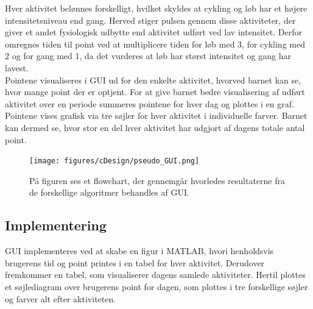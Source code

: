 Hver aktivitet belønnes forskelligt, hvilket skyldes at cykling og løb har et højere intensitetsniveau end gang. Herved stiger pulsen gennem disse aktiviteter, der giver et andet fysiologisk udbytte end aktivitet udført ved lav intensitet. Derfor omregnes tiden til point ved at multiplicere tiden for løb med 3, for cykling med 2 og for gang med 1, da det vurderes at løb har størst intensitet og gang har lavest.\\ 
Pointene visualiseres i GUI ud for den enkelte aktivitet, hvorved barnet kan se, hvor mange point der er optjent. For at give barnet bedre visualisering af udført aktivitet over en periode summeres pointene for hver dag og plottes i en graf. Pointene vises grafisk via tre søjler for hver aktivitet i individuelle farver. Barnet kan dermed se, hvor stor en del hver aktivitet har udgjort af dagens totale antal point.  
\begin{figure}[H]
	\centering
	\texttt{[image: figures/cDesign/pseudo\_GUI.png]}
	\caption{På figuren ses et flowchart, der gennemgår hvorledes resultaterne fra de forskellige algoritmer behandles af GUI.}
	\label{fig:GUI}
\end{figure}\vspace{-.25cm}

\subsection{Implementering}
GUI implementeres ved at skabe en figur i MATLAB, hvori henholdsvis brugerens tid og point printes i en tabel for hver aktivitet. Derudover fremkommer en tabel, som visualiserer dagens samlede aktiviteter. Hertil plottes et søjlediagram over brugerens point for dagen, som plottes i tre forskellige søjler og farver alt efter aktiviteten.

